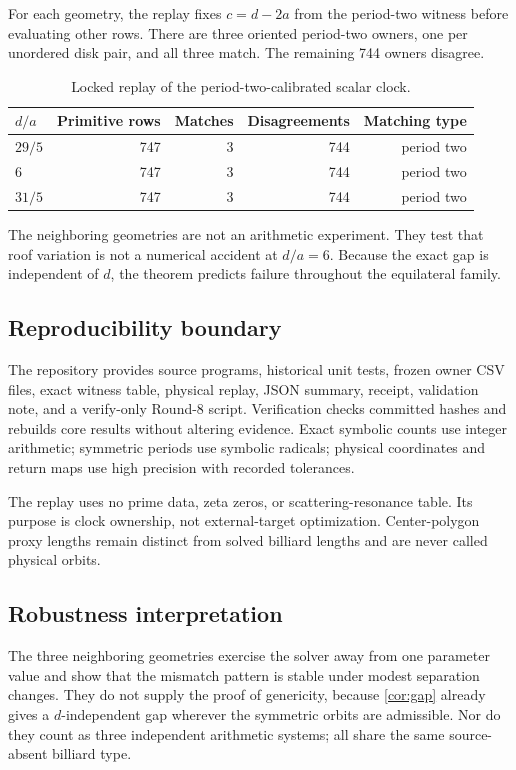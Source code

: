 \documentclass[11pt,a4paper]{article}
\theoremstyle{definition}
\theoremstyle{remark}
\begin{document}
For each geometry, the replay fixes \(c=d-2a\) from the period-two witness before evaluating other rows. There are three oriented period-two owners, one per unordered disk pair, and all three match. The remaining 744 owners disagree.

\begin{table}[t]
\centering
\caption{Locked replay of the period-two-calibrated scalar clock.}
\label{tab:replay}
\begin{tabular}{lrrrr}
\toprule
\(d/a\) & Primitive rows & Matches & Disagreements & Matching type \\
\midrule
\(29/5\) & 747 & 3 & 744 & period two \\
\(6\) & 747 & 3 & 744 & period two \\
\(31/5\) & 747 & 3 & 744 & period two \\
\bottomrule
\end{tabular}
\end{table}

The neighboring geometries are not an arithmetic experiment. They test that roof variation is not a numerical accident at \(d/a=6\). Because the exact gap is independent of \(d\), the theorem predicts failure throughout the equilateral family.

\subsection{Reproducibility boundary}

The repository provides source programs, historical unit tests, frozen owner CSV files, exact witness table, physical replay, JSON summary, receipt, validation note, and a verify-only Round-8 script. Verification checks committed hashes and rebuilds core results without altering evidence. Exact symbolic counts use integer arithmetic; symmetric periods use symbolic radicals; physical coordinates and return maps use high precision with recorded tolerances.

The replay uses no prime data, zeta zeros, or scattering-resonance table. Its purpose is clock ownership, not external-target optimization. Center-polygon proxy lengths remain distinct from solved billiard lengths and are never called physical orbits.

\subsection{Robustness interpretation}

The three neighboring geometries exercise the solver away from one parameter value and show that the mismatch pattern is stable under modest separation changes. They do not supply the proof of genericity, because \cref{cor:gap} already gives a \(d\)-independent gap wherever the symmetric orbits are admissible. Nor do they count as three independent arithmetic systems; all share the same source-absent billiard type.
\end{document}
